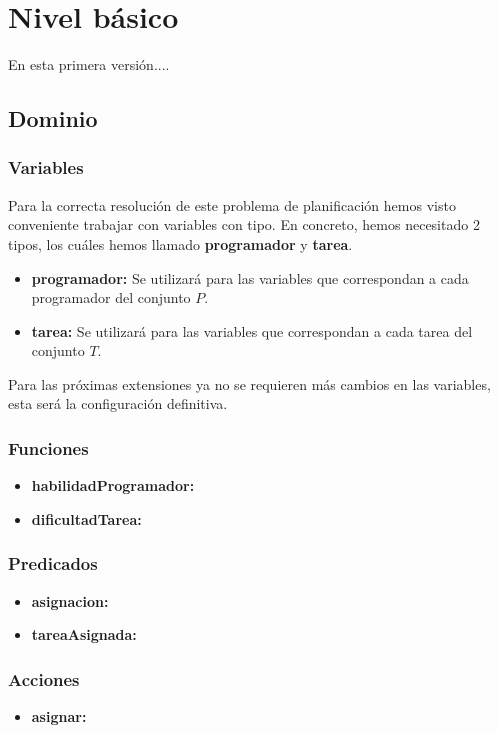 \documentclass[12pt]{article}
\begin{document}
\section{Nivel básico} \label{basic}
En esta primera versión....


\subsection{Dominio}
\subsubsection{Variables}
Para la correcta resolución de este problema de planificación hemos visto conveniente trabajar con variables con tipo.
En concreto, hemos necesitado 2 tipos, los cuáles hemos llamado \textbf{programador} y \textbf{tarea}.

\begin{itemize}
  \item \textbf{programador:} Se utilizará para las variables que correspondan a cada programador del conjunto $P$.
  \item \textbf{tarea:} Se utilizará para las variables que correspondan a cada tarea del conjunto $T$.
\end{itemize}

Para las próximas extensiones ya no se requieren más cambios en las variables, esta será la configuración definitiva.

\subsubsection{Funciones}
\begin{itemize}
  \item \textbf{habilidadProgramador:}
  \item \textbf{dificultadTarea:}
\end{itemize}
\subsubsection{Predicados} \label{basic_predicado}
\begin{itemize}
  \item \textbf{asignacion:}
  \item \textbf{tareaAsignada:}
\end{itemize}
\subsubsection{Acciones} \label{basic_accion}
\begin{itemize}
  \item \textbf{asignar:}
\end{itemize}
\end{document}
